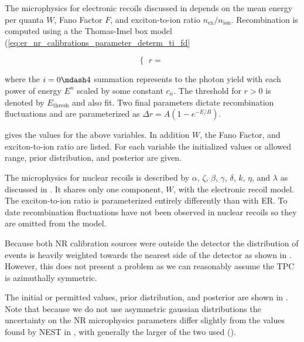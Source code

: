 The microphysics for electronic recoils discussed in  depends on the mean energy
per quanta $W$, Fano Factor $F$, and exciton-to-ion ratio $n_{\mathrm{ex}} / n_{\mathrm{ion}}$.  Recombination is computed using
a the Thomas-Imel box model (\eqref{eq:er_nr_calibrations_parameter_determ_ti_fd}

\begin{equation}
\begin{cases}
r =
\end{cases}
\end{equation}

\noindent where the $i = 0 \mdash 4$ summation represents to the photon yield with each power of energy $E^n$ scaled by some constant
$c_n$.  The threshold for $r > 0$ is denoted by $E_{\mathrm{thresh}}$ and also fit.  Two final parameters dictate recombination
fluctuations and are parameterized as $\Delta r = A (1 - e^{-E / B})$.

 gives the values for the above variables.  In addition $W$, the Fano Factor, and exciton-to-ion
ratio are listed.  For each variable the initialized values or allowed range, prior distribution, and posterior are given.

The microphysics for nuclear recoils is described by $\alpha$, $\zeta$, $\beta$, $\gamma$, $\delta$, $k$, $\eta$, and $\lambda$ as
discussed in .  It shares only one
component, $W$, with the electronic recoil model.  The exciton-to-ion ratio is parameterized entirely differently than with ER.  To date
recombination fluctuations have not been observed in nuclear recoils so they are omitted from the model.

Because both NR calibration sources were outside the detector the distribution of events is heavily weighted towards the nearest side of
the detector as shown in .  However, this does not present a problem as
we can reasonably assume the TPC is azimuthally symmetric.

The initial or permitted values, prior distribution, and posterior are shown in .  Note that
because we do not use asymmetric gaussian distributions the uncertainty on the NR microphysics parameters differ slightly from the values
found by NEST in , with generally the larger of the two used
().

